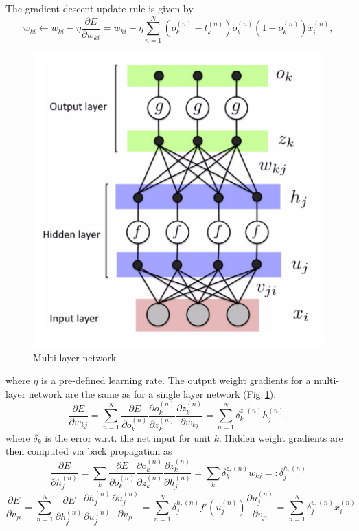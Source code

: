 The gradient descent update rule is given by
$$w_{ki} \leftarrow w_{ki} - \eta \frac{\partial E}{\partial w_{ki}} = w_{ki} - \eta  \sum_{n=1}^N (o_k^{(n)} - t_k^{(n)})o_k^{(n)} (1-o_k^{(n)}) x_i^{(n)},$$
\begin{figure}[h]
	\centering
	\includegraphics[scale=0.5]{Figs/multilayerbackprop.png}
    \caption{Multi layer network}
    \label{multi}
\end{figure}
where $\eta$ is a pre-defined learning rate. The output weight gradients for a multi-layer network are the same as for a single layer network (Fig.\,\ref{multi}):
$$\frac{\partial E}{\partial w_{kj}} =  \sum_{n=1}^N \frac{\partial E}{\partial o_{k}^{(n)}}\frac{\partial o_{k}^{(n)}}{\partial z_{k}^{(n)}} \frac{\partial z_{k}^{(n)}}{\partial w_{kj}} = \sum_{n=1}^N \delta_k^{z,(n)} h_j^{(n)},$$
where $\delta_k$ is the error w.r.t. the net input for unit $k$. Hidden weight gradients are then computed via back propagation as
$$\frac{\partial E}{\partial h_{j}^{(n)}} =  \sum_{k} \frac{\partial E}{\partial o_{k}^{(n)}}\frac{\partial o_{k}^{(n)}}{\partial z_{k}^{(n)}} \frac{\partial z_{k}^{(n)}}{\partial h_{j}^{(n)}} = \sum_{k} \delta_k^{z,(n)} w_{kj} =: \delta_j^{h,(n)}$$
$$ \frac{\partial E}{\partial v_{ji}} 
= \sum_{n=1}^N \frac{\partial E}{\partial h_{j}^{(n)}}\frac{\partial h_{j}^{(n)}}{\partial u_{j}^{(n)}} \frac{\partial u_j^{(n)}}{\partial v_{ji}}
= \sum_{n=1}^N \delta_j^{h,(n)} f'(u_j^{(n)})\frac{\partial u_j^{(n)}}{\partial v_{ji}} 
= \sum_{n=1}^N \delta_j^{u,(n)} x_i^{(n)} $$

